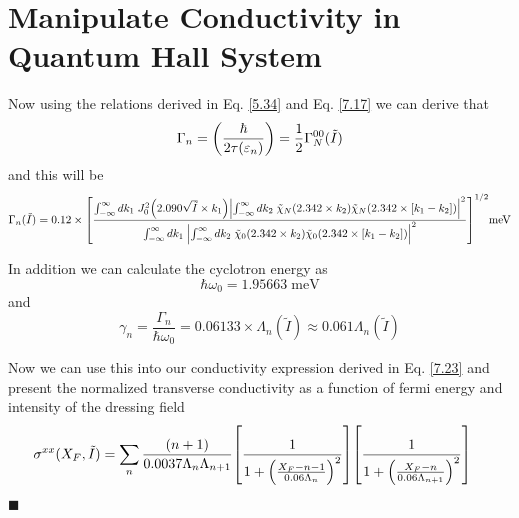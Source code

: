 \section{Manipulate Conductivity in Quantum Hall System}

Now using the relations derived in Eq. \eqref{5.34} and Eq. \eqref{7.17} we can derive that
\begin{equation} \label{8.1}
  \Gamma_n = \qty(\frac{\hbar }{2\tau(\varepsilon_n)}) =
  \frac{1}{2}\Gamma^{00}_{N}(\tilde{I})
\end{equation}
and this will be
\begin{equation} \label{8.2}
  \Gamma_n(\tilde{I}) = 0.12\times
  \qty[
  \frac
  {\int_{-\infty}^{\infty} d {k}_1 \;
  J_0^2\qty(2.090\sqrt{\tilde{I}}\times{k}_1)
  \qty|
  \int_{-\infty}^{\infty} d{k}_2 \;
  \tilde{\chi}_{N}\qty(2.342 \times k_2)
  \tilde{\chi}_{N}\qty(2.342 \times \qty[{k}_1 - {k}_2])|^2}
  {\int_{-\infty}^{\infty} d {k}_1 \;
  \qty|
  \int_{-\infty}^{\infty} d{k}_2 \;
  \tilde{\chi}_{0}\qty(2.342 \times k_2)
  \tilde{\chi}_{0}\qty(2.342 \times \qty[{k}_1 - {k}_2])|^2}
  ]^{1/2} \text{meV}
\end{equation}

\noindent
In addition we can calculate the cyclotron energy as
\begin{equation} \label{8.3}
  \hbar\omega_0 = 1.95663 \;\text{meV}
\end{equation}
and
\begin{equation} \label{8.4}
  \gamma_n = \frac{\Gamma_n}{\hbar \omega_0} = 0.06133 \times \Lambda_n(\tilde{I}) \approx 0.061 \Lambda_n(\tilde{I})
\end{equation}

\noindent
Now we can use this into our conductivity expression derived in Eq. \eqref{7.23} and present the normalized transverse conductivity as a function of fermi energy and intensity of the dressing field
\begin{equation} \label{8.5}
  \begin{aligned}
    \sigma^{xx}(X_F,\tilde{I}) & =
    \sum_{n}
    \frac{\qty(n+1)}{0.0037\Lambda_n \Lambda_{n+1}}
    \qty[
      \frac{1}
      {
        1 + \qty(\frac{X_F - n -1}{0.06\Lambda_n})^2
      }
    ]
    \qty[
      \frac{1}
      {
        1 + \qty(\frac{X_F - n}{0.06\Lambda_{n+1}})^2
      }
    ]
  \end{aligned}
\end{equation}















\hfill$\blacksquare$
